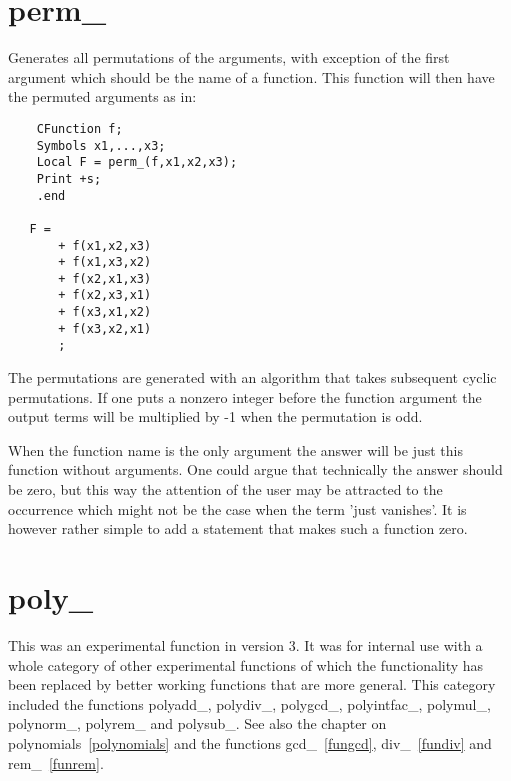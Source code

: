 
\section{perm\_}
\label{funperm}
\noindent Generates all permutations of the arguments, with exception 
of the first argument which should be the name of a function. This function 
will then have the permuted arguments as in:
\begin{verbatim}
    CFunction f;
    Symbols x1,...,x3;
    Local F = perm_(f,x1,x2,x3);
    Print +s;
    .end

   F =
       + f(x1,x2,x3)
       + f(x1,x3,x2)
       + f(x2,x1,x3)
       + f(x2,x3,x1)
       + f(x3,x1,x2)
       + f(x3,x2,x1)
       ;
\end{verbatim}
The permutations are generated with an algorithm that takes subsequent 
cyclic permutations. If one puts a nonzero integer before the function 
argument the output terms will be multiplied by -1 when the permutation is 
odd.

When the function name is the only argument the answer will be just this 
function without arguments. One could argue that technically the answer 
should be zero, but this way the attention of the user may be attracted to 
the occurrence which might not be the case when the term 'just vanishes'. 
It is however rather simple to add a statement that makes such a function 
zero.


\section{poly\_}
\label{funpoly}
\noindent This was an experimental function in version 3. It was for 
internal use with a whole category of other experimental functions of which 
the functionality has been replaced by better working functions that are 
more general. This category included the functions 
polyadd\_,
polydiv\_,
polygcd\_,
polyintfac\_,
polymul\_,
polynorm\_,
polyrem\_ and
polysub\_.
See also the chapter on polynomials~\ref{polynomials} and the functions 
gcd\_~\ref{fungcd}, div\_~\ref{fundiv} and rem\_~\ref{funrem}.

